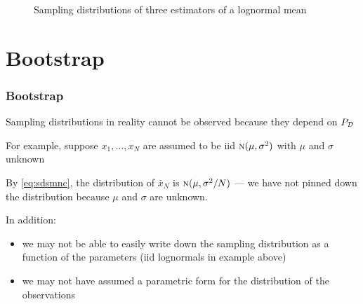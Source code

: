 \begin{frame}

    \vspace{2em}
    \begin{figure}
        \centering
        \caption{\label{f:sampling_distributions} Sampling distributions of three estimators of a lognormal mean}
    \end{figure}

\end{frame}

\section{Bootstrap}

\begin{frame}\frametitle{Bootstrap}

    \vspace{2em}
    Sampling
    distributions in reality cannot be observed  because they depend on $P_{\mathcal D}$
    
    \vspace{.7em}
    For example, suppose $x_1, \ldots, x_N$
    are assumed to be {\sc iid} $\textrm{\sc n}(\mu, \sigma^2)$
    with $\mu$ and $\sigma$ unknown
    
    By \eqref{eq:sdsmnc}, the distribution of $\bar x_N$ is $\textrm{\sc n}(\mu,
    \sigma^2/N)$ --- we have not pinned down the distribution because
    $\mu$ and $\sigma$ are unknown.

\end{frame}

\begin{frame}

    \vspace{2em}
    In addition:
    \begin{itemize}
        \item  we may not be able to easily write down the sampling
    distribution as a function of the parameters ({\sc iid} lognormals
    in example above)
        \item we
    may not have assumed a parametric form for the distribution of the
    observations
    \end{itemize}
    
\end{frame}



